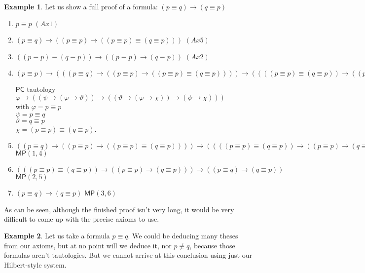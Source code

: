 \documentclass{article}
\theoremstyle{definition}
\theoremstyle{definition}
\newtheorem{example}{Example}[section]
\theoremstyle{definition}
\theoremstyle{definition}
\theoremstyle{definition}
\newcommand*{\id}{\equiv}
\newcommand*{\ra}{\rightarrow}
\newcommand{\PC}{$\mathsf{PC}$\xspace}
\newcommand{\MP}{\mathsf{MP}}
\begin{document}
\begin{example}
    \label{ex_pqqp}
    Let us show a full proof of a formula: $(p \id q) \ra (q \id p)$

    \begin{enumerate}
        \item $p \id p$ \hfill $(Ax1)$
        \item $(p \id q) \ra ((p \id p) \ra ((p \id p) \id (q \id p)))$ \hfill $(Ax5)$
        \item $((p \id p) \id (q \id p)) \ra ((p \id p) \ra (q \id p))$ \hfill $(Ax2)$
        \item $(p \id p) \ra (((p \id q) \ra ((p \id p) \ra ((p \id p) \id (q \id p)))) \ra ((((p \id p) \id (q \id p)) \ra ((p \id p) \ra (q \id p))) \ra ((p \id q) \ra (q \id p))))$
              \begin{flushright}
                  \PC tautology $\varphi \ra ((\psi \ra (\varphi \ra \vartheta)) \ra ((\vartheta \ra (\varphi \ra \chi)) \ra (\psi \ra \chi)))$
                  \\
                  with $\varphi = p \id p$\\$\psi = p \id q$\\$\vartheta = q \id p$\\$\chi = (p \id p) \id (q \id p)$.
              \end{flushright}
        \item $((p \id q) \ra ((p \id p) \ra ((p \id p) \id (q \id p)))) \ra ((((p \id p) \id (q \id p)) \ra ((p \id p) \ra (q \id p))) \ra ((p \id q) \ra (q \id p)))$ \hfill $\MP(1, 4)$
        \item $(((p \id p) \id (q \id p)) \ra ((p \id p) \ra (q \id p))) \ra ((p \id q) \ra (q \id p))$ \hfill $\MP(2, 5)$
        \item $(p \id q) \ra (q \id p)$ \hfill $\MP(3, 6)$
    \end{enumerate}

\end{example}
%
As can be seen, although the finished proof isn't very long, it would be very
difficult to come up with the precise axioms to use.

\begin{example}
    Let us take a formula $p \id q$. We could be deducing many theses from our axioms, but at no point will we deduce it, nor $p \not \id q$, because those formulas aren't tautologies. But we cannot arrive at this conclusion using just our Hilbert-style system.
\end{example}
\end{document}
